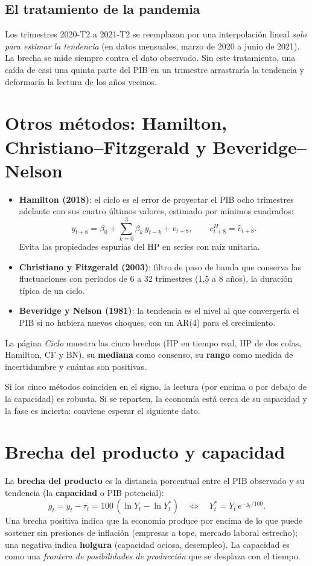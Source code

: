 \subsection{El tratamiento de la pandemia}
Los trimestres 2020-T2 a 2021-T2 se reemplazan por una interpolación lineal \emph{solo para estimar la tendencia}
(en datos mensuales, marzo de 2020 a junio de 2021). La brecha se mide siempre contra el dato observado. Sin este
tratamiento, una caída de casi una quinta parte del PIB en un trimestre arrastraría la tendencia y deformaría la
lectura de los años vecinos.

\section{Otros métodos: Hamilton, Christiano--Fitzgerald y Beveridge--Nelson}
\label{es:f:metodos}
\begin{itemize}
\item \textbf{Hamilton (2018)}: el ciclo es el error de proyectar el PIB ocho trimestres adelante con sus cuatro
  últimos valores, estimado por mínimos cuadrados:
  \[
  y_{t+8}=\beta_0+\sum_{k=0}^{3}\beta_k\,y_{t-k}+v_{t+8},\qquad c^{H}_{t+8}=\hat v_{t+8}.
  \]
  Evita las propiedades espurias del HP en series con raíz unitaria.
\item \textbf{Christiano y Fitzgerald (2003)}: filtro de paso de banda que conserva las fluctuaciones con períodos de
  6 a 32 trimestres (1,5 a 8 años), la duración típica de un ciclo.
\item \textbf{Beveridge y Nelson (1981)}: la tendencia es el nivel al que convergería el PIB si no hubiera nuevos
  choques, con un AR(4) para el crecimiento.
\end{itemize}
La página \emph{Ciclo} muestra las cinco brechas (HP en tiempo real, HP de dos colas, Hamilton, CF y BN), su
\textbf{mediana} como consenso, su \textbf{rango} como medida de incertidumbre y cuántas son positivas.

\begin{leer}
Si los cinco métodos coinciden en el signo, la lectura (por encima o por debajo de la capacidad) es robusta. Si se
reparten, la economía está cerca de su capacidad y la fase es incierta: conviene esperar el siguiente dato.
\end{leer}

\section{Brecha del producto y capacidad}
\label{es:f:brecha}
La \textbf{brecha del producto} es la distancia porcentual entre el PIB observado y su tendencia (la
\textbf{capacidad} o PIB potencial):
\[
g_t=y_t-\tau_t=100\,(\ln Y_t-\ln Y^*_t)\quad\Longleftrightarrow\quad Y^*_t=Y_t\,e^{-g_t/100}.
\]
Una brecha positiva indica que la economía produce por encima de lo que puede sostener sin presiones de inflación
(empresas a tope, mercado laboral estrecho); una negativa indica \textbf{holgura} (capacidad ociosa, desempleo). La
capacidad es como una \emph{frontera de posibilidades de producción} que se desplaza con el tiempo.

